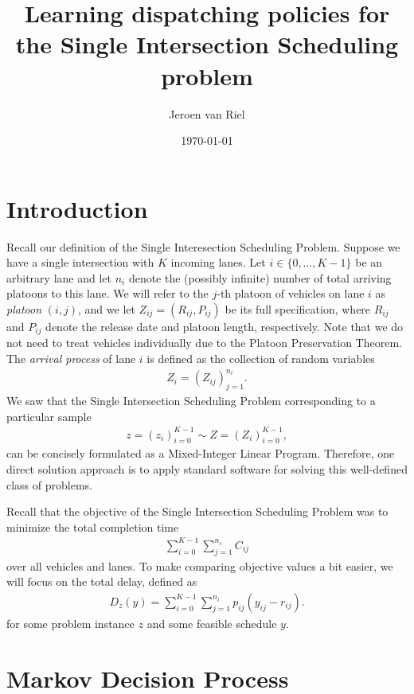 \documentclass{article}
\title{Learning dispatching policies for the Single Intersection Scheduling problem}
\author{Jeroen van Riel}
\date{\monthyeardate\today}
\theoremstyle{definition}
\theoremstyle{plain}
\begin{document}
\maketitle

\section{Introduction}

Recall our definition of the Single Interesection Scheduling Problem. Suppose we
have a single intersection with $K$ incoming lanes. Let
$i \in \{0, \dots, K - 1\}$ be an arbitrary lane and let $n_{i}$ denote the
(possibly infinite) number of total arriving platoons to this lane. We will
refer to the $j$-th platoon of vehicles on lane $i$ as \textit{platoon}
$(i, j)$, and we let $Z_{ij} = (R_{ij}, P_{ij})$ be its full specification,
where $R_{ij}$ and $P_{ij}$ denote the release date and platoon length,
respectively. Note that we do not need to treat vehicles individually due to the
Platoon Preservation Theorem.
The \textit{arrival process} of lane $i$ is defined as the collection of random variables
\begin{align}
  Z_{i} = { (Z_{ij}) }_{j=1}^{n_{i}} .
\end{align}
We saw that the Single Intersection Scheduling Problem corresponding to a
particular sample
\begin{align}
  z = {( z_{i} )}_{i=0}^{K-1} \sim Z = {( Z_{i} )}_{i=0}^{K-1} ,
\end{align}
can be concisely formulated as a Mixed-Integer Linear Program. Therefore, one
direct solution approach is to apply standard software for solving this
well-defined class of problems.

Recall that the objective of the Single Intersection Scheduling Problem was to minimize the total completion time
\begin{align}
  \sum_{i=0}^{K-1} \sum_{j=1}^{n_{i}} C_{ij}
\end{align}
over all vehicles and lanes.
%
To make comparing objective values a bit easier, we will focus on the total delay, defined as
\begin{align}
  D_{z}(y) = \sum_{i=0}^{K-1} \sum_{j=1}^{n_{i}} p_{ij} (y_{ij} - r_{ij}) .
\end{align}
for some problem instance $z$ and some feasible schedule $y$.


\section{Markov Decision Process}
\end{document}
